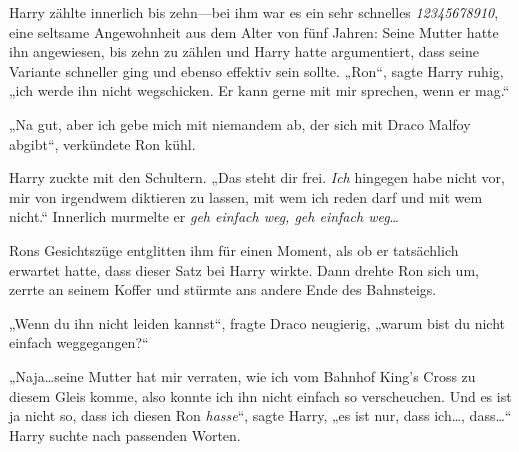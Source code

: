 Harry zählte innerlich bis zehn—bei ihm war es ein sehr schnelles \emph{12345678910}, eine seltsame Angewohnheit aus dem Alter von fünf Jahren: Seine Mutter hatte ihn angewiesen, bis zehn zu zählen und Harry hatte argumentiert, dass seine Variante schneller ging und ebenso effektiv sein sollte. „Ron“, sagte Harry ruhig, „ich werde ihn nicht wegschicken. Er kann gerne mit mir sprechen, wenn er mag.“

„Na gut, aber ich gebe mich mit niemandem ab, der sich mit Draco Malfoy abgibt“, verkündete Ron kühl.

Harry zuckte mit den Schultern. „Das steht dir frei. \emph{Ich} hingegen habe nicht vor, mir von irgendwem diktieren zu lassen, mit wem ich reden darf und mit wem nicht.“ Innerlich murmelte er \emph{geh einfach weg, geh einfach weg}…

Rons Gesichtszüge entglitten ihm für einen Moment, als ob er tatsächlich erwartet hatte, dass dieser Satz bei Harry wirkte. Dann drehte Ron sich um, zerrte an seinem Koffer und stürmte ans andere Ende des Bahnsteigs.

„Wenn du ihn nicht leiden kannst“, fragte Draco neugierig, „warum bist du nicht einfach weggegangen?“

„Naja…seine Mutter hat mir verraten, wie ich vom Bahnhof King’s Cross zu diesem Gleis komme, also konnte ich ihn nicht einfach so verscheuchen. Und es ist ja nicht so, dass ich diesen Ron \emph{hasse}“, sagte Harry, „es ist nur, dass ich…, dass…“ Harry suchte nach passenden Worten.

